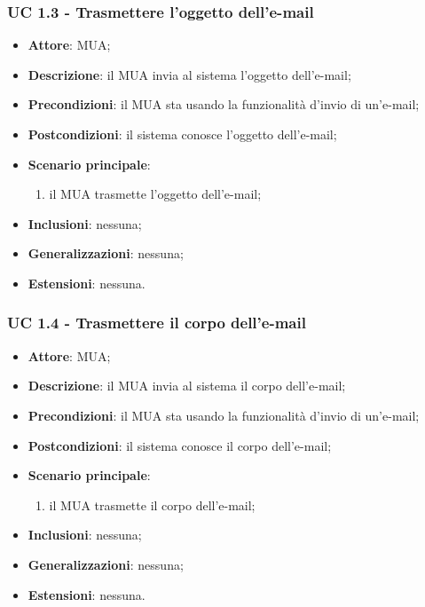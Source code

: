     \subsubsection{UC 1.3 - Trasmettere l'oggetto dell'e-mail} \label{sec:UC1.3}
    \begin{itemize}
        \item \textbf{Attore}: MUA;
        \item \textbf{Descrizione}: il MUA invia al sistema l'oggetto dell'e-mail;
        \item \textbf{Precondizioni}: il MUA sta usando la funzionalità d'invio di un'e-mail;
        \item \textbf{Postcondizioni}: il sistema conosce l'oggetto dell'e-mail;
        \item \textbf{Scenario principale}:
            \begin{enumerate}
                \item il MUA trasmette l'oggetto dell'e-mail;
            \end{enumerate}
        \item \textbf{Inclusioni}: nessuna;
        \item \textbf{Generalizzazioni}: nessuna;
        \item \textbf{Estensioni}: nessuna.
    \end{itemize}

    \subsubsection{UC 1.4 - Trasmettere il corpo dell'e-mail} \label{sec:UC1.4}
    \begin{itemize}
        \item \textbf{Attore}: MUA;
        \item \textbf{Descrizione}: il MUA invia al sistema il corpo dell'e-mail;
        \item \textbf{Precondizioni}: il MUA sta usando la funzionalità d'invio di un'e-mail;
        \item \textbf{Postcondizioni}: il sistema conosce il corpo dell'e-mail;
        \item \textbf{Scenario principale}:
            \begin{enumerate}
                \item il MUA trasmette il corpo dell'e-mail;
            \end{enumerate}
        \item \textbf{Inclusioni}: nessuna;
        \item \textbf{Generalizzazioni}: nessuna;
        \item \textbf{Estensioni}: nessuna.
    \end{itemize}

